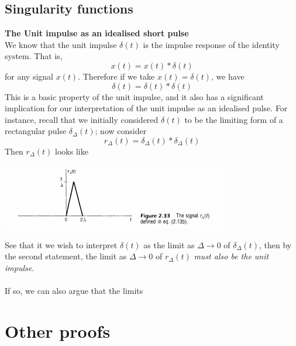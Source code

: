 \documentclass{report}
\begin{document}
\section{Singularity functions}
\textbf{The Unit impulse as an idealised short pulse}\\
We know that the unit impulse $\delta(t)$ is the impulse response of the identity system. That is,
\begin{equation*}
x(t)=x(t)*\delta(t)
\end{equation*}
for any signal $x(t)$. Therefore if we take $x(t)=\delta(t)$, we have
\begin{equation*}
\delta(t)=\delta(t)*\delta(t)
\end{equation*}
This is a basic property of the unit impulse, and it also has a significant implication for our interpretation of the unit
impulse as an idealised pulse. For instance, recall that we initially
considered $\delta(t)$ to be the limiting form of a rectangular pulse $\delta_\Delta(t)$; now consider
\begin{equation*}
r_\Delta(t)=\delta_\Delta(t)*\delta_\Delta(t)
\end{equation*}
Then $r_\Delta(t)$ looks like
\begin{center}
\includegraphics[width=10cm]{a53}
\end{center}
See that it we wish to interpret $\delta(t)$ as the limit as $\Delta\to0$ of $\delta_\Delta(t)$, then by the second statement, the
limit as $\Delta\to0$ of $r_\Delta(t)$ \textit{must also be the unit impulse}.\\
\vspace{1mm}\\
If so, we can also argue that the limits 













\appendix
\chapter{Other proofs}
\end{document}
